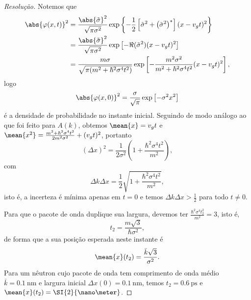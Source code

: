 \begin{proof}[Resolução]
    Notemos que
    \begin{align*}
        \abs{\varphi(x,t)}^2 &= \frac{\abs{\tilde{\sigma}}^2}{\sqrt{\pi \sigma^2}} \exp\left\{-\frac{1}{2}\left[\tilde{\sigma}^2 + \left(\tilde{\sigma}^2\right)^*\right](x - v_g t)^2\right\} \\
                             &= \frac{\abs{\tilde{\sigma}}^2}{\sqrt{\pi \sigma^2}} \exp\left[-\Re(\tilde{\sigma}^2)(x - v_gt)^2\right]\\
                             &= \frac{m \sigma}{\sqrt{\pi (m^2 + \hbar^2 \sigma^4 t^2)}} \exp\left[-\frac{m^2 \sigma^2}{m^2 + \hbar^2 \sigma^4 t^2}(x - v_g t)^2\right],
    \end{align*}
    logo
    \begin{equation*}
        \abs{\varphi(x,0)}^2 = \frac{\sigma}{\sqrt{\pi}}\exp\left[- \sigma^2 x^2\right]
    \end{equation*}
    é a densidade de probabilidade no instante inicial. Seguindo de modo análogo ao que foi feito para \(A(k)\), obtemos \(\mean{x} = v_g t\) e \(\mean{x^2} = \frac{m^2 + \hbar^2 \sigma^4 t^2}{2m^2 \sigma^2} + (v_g t)^2\), portanto
    \begin{equation*}
        (\Delta x)^2 = \frac{1}{2\sigma^2}\left(1 + \frac{\hbar^2 \sigma^4 t^2}{m^2}\right),
    \end{equation*}
    com
    \begin{equation*}
        \Delta k \Delta x = \frac12\sqrt{1 + \frac{\hbar ^2 \sigma^4 t^2}{m^2}},
    \end{equation*}
    isto é, a incerteza é mínima apenas em \(t = 0\) e temos \(\Delta k \Delta x > \frac12\) para todo \(t \neq 0\).

    Para que o pacote de onda duplique sua largura, devemos ter \(\frac{\hbar^2 \sigma^4 t_2^2}{m^2} = 3\), isto é,
    \begin{equation*}
        t_2 = \frac{m\sqrt{3}}{\hbar \sigma^2},
    \end{equation*}
    de forma que a sua posição esperada neste instante é
    \begin{equation*}
        \mean{x}(t_2) = \frac{\bar{k} \sqrt{3}}{\sigma^2}.
    \end{equation*}
    Para um nêutron cujo pacote de onda tem comprimento de onda médio \(\bar{k} = \SI{0.1}{\nano\meter}\) e largura inicial \(\Delta x(0) = \SI{0.1}{\nano\meter}\), temos \(t_2 = \SI{0.6}{\pico\second}\) e \(\mean{x}(t_2) = \SI{2}{\nano\meter}\).
\end{proof}
